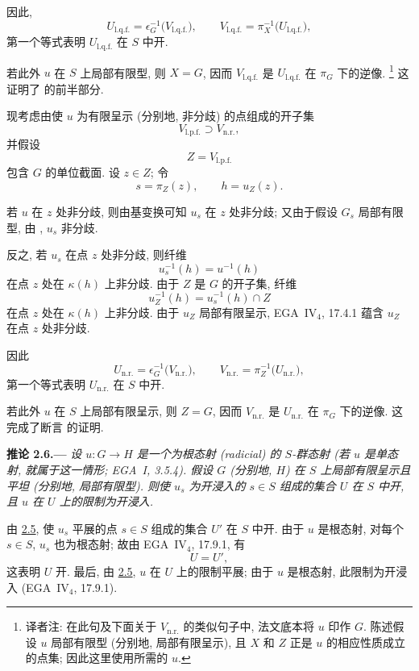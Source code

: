 因此,
\[
  U_{\mathrm{l.q.f.}}
    =\epsilon_G^{-1}\bigl(V_{\mathrm{l.q.f.}}\bigr),
  \qquad
  V_{\mathrm{l.q.f.}}
    =\pi_X^{-1}\bigl(U_{\mathrm{l.q.f.}}\bigr),
\]
第一个等式表明 \(U_{\mathrm{l.q.f.}}\) 在 \(S\) 中开.

若此外 \(u\) 在 \(S\) 上局部有限型,
则 \(X=G\), 因而 \(V_{\mathrm{l.q.f.}}\) 是
\(U_{\mathrm{l.q.f.}}\) 在 \(\pi_G\) 下的逆像.%
\begingroup
\renewcommand{\thefootnote}{\fnsymbol{footnote}}%
\footnote[1]{\label{note:sga3-VIB-2.5-u-loci}译者注:
在此句及下面关于 \(V_{\mathrm{n.r.}}\) 的类似句子中,
法文底本将 \(u\) 印作 \(G\).
陈述假设 \(u\) 局部有限型 (分别地, 局部有限呈示),
且 \(X\) 和 \(Z\) 正是 \(u\) 的相应性质成立的点集;
因此这里使用所需的 \(u\).}%
\endgroup{}
这证明了 \textup{} 的前半部分.

现考虑由使 \(u\) 为有限呈示 (分别地, 非分歧) 的点组成的开子集
\[
  V_{\mathrm{l.p.f.}}\supset V_{\mathrm{n.r.}},
\]
并假设
\[
  Z=V_{\mathrm{l.p.f.}}
\]
包含 \(G\) 的单位截面. 设 \(z\in Z\); 令
\[
  s=\pi_Z(z),\qquad h=u_Z(z).
\]

若 \(u\) 在 \(z\) 处非分歧, 则由基变换可知 \(u_s\)
在 \(z\) 处非分歧; 又由于假设 \(G_s\) 局部有限型,
由 , \(u_s\) 非分歧.

反之, 若 \(u_s\) 在点 \(z\) 处非分歧, 则纤维
\[
  u_s^{-1}(h)=u^{-1}(h)
\]
在点 \(z\) 处在 \(\kappa(h)\) 上非分歧.
由于 \(Z\) 是 \(G\) 的开子集, 纤维
\[
  u_Z^{-1}(h)=u_s^{-1}(h)\cap Z
\]
在点 \(z\) 处在 \(\kappa(h)\) 上非分歧.
由于 \(u_Z\) 局部有限呈示,
EGA~IV\(_4\), 17.4.1 蕴含 \(u_Z\) 在点 \(z\) 处非分歧.

因此
\[
  U_{\mathrm{n.r.}}
    =\epsilon_G^{-1}\bigl(V_{\mathrm{n.r.}}\bigr),
  \qquad
  V_{\mathrm{n.r.}}
    =\pi_Z^{-1}\bigl(U_{\mathrm{n.r.}}\bigr),
\]
第一个等式表明 \(U_{\mathrm{n.r.}}\) 在 \(S\) 中开.

若此外 \(u\) 在 \(S\) 上局部有限呈示,
则 \(Z=G\), 因而 \(V_{\mathrm{n.r.}}\) 是
\(U_{\mathrm{n.r.}}\) 在 \(\pi_G\) 下的逆像.
这完成了断言 \textup{} 的证明.

\medskip
{}\label{cor:sga3-VIB-2.6}%
\noindent\textbf{推论 2.6.---}
\emph{设 \(u:G\to H\) 是一个为根态射 (radicial) 的 \(S\)-群态射
(若 \(u\) 是单态射, 就属于这一情形; EGA~I, 3.5.4).
假设 \(G\) (分别地, \(H\)) 在 \(S\) 上局部有限呈示且平坦
(分别地, 局部有限型).
则使 \(u_s\) 为开浸入的 \(s\in S\) 组成的集合 \(U\)
在 \(S\) 中开, 且 \(u\) 在 \(U\) 上的限制为开浸入.}

由 \hyperref[concl:sga3-VIB-2.5-i]{2.5}\textup{},
使 \(u_s\) 平展的点 \(s\in S\) 组成的集合 \(U'\) 在 \(S\) 中开.
由于 \(u\) 是根态射, 对每个 \(s\in S\), \(u_s\) 也为根态射;
故由 EGA~IV\(_4\), 17.9.1, 有
\[
  U=U',
\]
这表明 \(U\) 开.
最后, 由 \hyperref[concl:sga3-VIB-2.5-i]{2.5}\textup{},
\(u\) 在 \(U\) 上的限制平展;
由于 \(u\) 是根态射, 此限制为开浸入 (EGA~IV\(_4\), 17.9.1).

